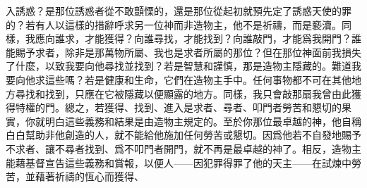 入誘惑？\newline{}是那位誘惑者從不敢顫慄的，還是那位從起初就預先定了誘惑天使的罪的？\newline{}若有人以這樣的措辭呼求另一位神而非造物主，他不是祈禱，而是褻瀆。\newline{}同樣，我應向誰求，才能獲得？\newline{}向誰尋找，才能找到？\newline{}向誰敲門，才能爲我開門？\newline{}\newline{}誰能賜予求者，除非是那萬物所屬、我也是求者所屬的那位？\newline{}但在那位神面前我損失了什麼，以致我要向他尋找並找到？\newline{}若是智慧和謹慎，那是造物主隱藏的。\newline{}難道我要向他求這些嗎？\newline{}若是健康和生命，它們在造物主手中。\newline{}任何事物都不可在其他地方尋找和找到，只應在它被隱藏以便顯露的地方。\newline{}同樣，我只會敲那扇我曾由此獲得特權的門。\newline{}總之，若獲得、找到、進入是求者、尋者、叩門者勞苦和懇切的果實，\newline{}你就明白這些義務和結果是由造物主規定的。\newline{}至於你那位最卓越的神，他自稱白白幫助非他創造的人，就不能給他施加任何勞苦或懇切。\newline{}因爲他若不自發地賜予不求者、讓不尋者找到、爲不叩門者開門，就不再是最卓越的神了。\newline{}相反，造物主能藉基督宣告這些義務和賞報，以便人——因犯罪得罪了他的天主——在試煉中勞苦，\newline{}並藉著祈禱的恆心而獲得、
